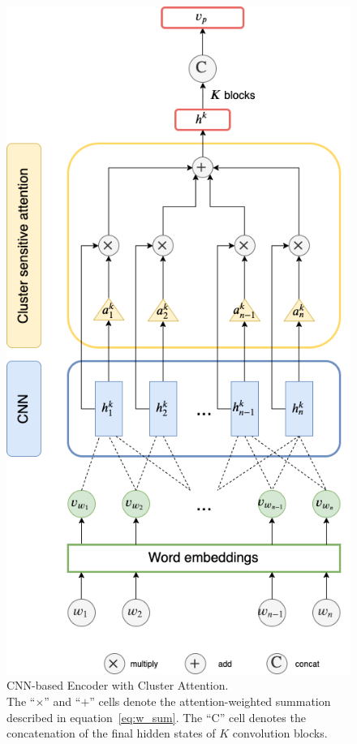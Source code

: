 \documentclass{bmcart}
\begin{document}
\begin{backmatter}
\begin{figure}[h!]
    \centering
    \captionsetup{justification=centering}
    \includegraphics[scale=0.5]{cnn.png}
    \caption{CNN-based Encoder with Cluster Attention. \\ The ``$\times$'' and ``$+$'' cells denote the attention-weighted summation described in equation~\ref{eq:w_sum}. The ``$\text{C}$'' cell denotes the concatenation of the final hidden states of $K$ convolution blocks.}

\end{figure}
\end{backmatter}
\end{document}
